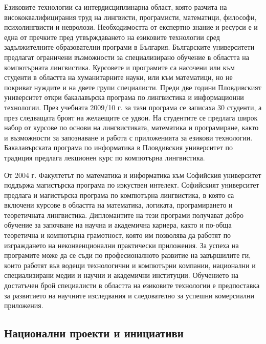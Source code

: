 \documentclass[]{../../metanetpaper}
\begin{document}
\begin{multicols}{2}
Езиковите технологии са интердисциплинарна област, която разчита на висококвалифицирания труд на лингвисти, програмисти, математици, философи, психолингвисти и невролози. Необходимостта от експертно знание и ресурси е и една от пречките пред утвърждаването на езиковите технологии сред задължителните образователни програми в България. 
Българските университети предлагат ограничени възможности за специализирано
 обучение в областта на компютърната лингвистика.
 Курсовете и програмите са насочени или
 към студенти в областта на хуманитарните науки, или
 към математици, но не покриват нуждите и на двете
 групи специалисти. Преди две години Пловдивският университет откри бакалавърска програма
 по лингвистика и информационни технологии. През
 учебната 2009/10 г. за тази програма се записаха 30
 студенти, а през следващата броят на желаещите се
 удвои. На студентите се предлага широк набор от курсове
 по
 основи
 на
 лингвистиката, математика
 и
 програмиране, както и възможности за запознаване и
 работа с приложенията за езикови технологии.
 Бакалавърската
 програма
 по
 информатика
 в
 Пловдивския университет по традиция предлага
 лекционен курс по компютърна лингвистика.

От 2004 г. Факултетът по математика и информатика към Софийския университет поддържа магистърска програма
 по
 изкуствен
 интелект.
 Софийският университет предлага и магистърска програма по компютърна лингвистика, в която са включени курсове в
 областта на математика, логиката, програмирането и
 теоретичната лингвистика. Дипломантите на тези програми получават добро
 обучение за започване на научна и академична кариера,
 както и по-обща теоретична и компютърна грамотност,
 която им позволява да работят по изграждането на
 неконвенционални практически приложения. За успеха
 на програмите може да се съди по професионалното
 развитие на завършилите ги, които работят във водещи
 технологични и компютърни компании, национални и
 специализирани медии и научни и академични
 институции.
Обучението на достатъчен брой специалисти в областта на езиковите технологии е предпоставка за развитието на научните изследвания и следователно за успешни комерсиални приложения. 

\subsection{Национални проекти и инициативи}


\end{multicols}
\end{document}
